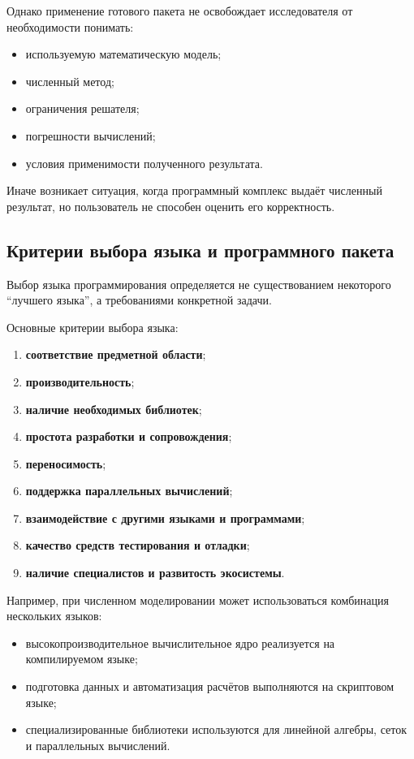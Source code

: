 Однако применение готового пакета не освобождает исследователя от необходимости понимать:
\begin{itemize}
	\item используемую математическую модель;
	\item численный метод;
	\item ограничения решателя;
	\item погрешности вычислений;
	\item условия применимости полученного результата.
\end{itemize}

Иначе возникает ситуация, когда программный комплекс выдаёт численный результат, но пользователь не способен оценить его корректность.


\subsection{Критерии выбора языка и программного пакета}

Выбор языка программирования определяется не существованием некоторого ``лучшего языка'', а требованиями конкретной задачи.

Основные критерии выбора языка:
\begin{enumerate}
	\item \textbf{соответствие предметной области};
	\item \textbf{производительность};
	\item \textbf{наличие необходимых библиотек};
	\item \textbf{простота разработки и сопровождения};
	\item \textbf{переносимость};
	\item \textbf{поддержка параллельных вычислений};
	\item \textbf{взаимодействие с другими языками и программами};
	\item \textbf{качество средств тестирования и отладки};
	\item \textbf{наличие специалистов и развитость экосистемы}.
\end{enumerate}

Например, при численном моделировании может использоваться комбинация нескольких языков:
\begin{itemize}
	\item высокопроизводительное вычислительное ядро реализуется на компилируемом языке;
	\item подготовка данных и автоматизация расчётов выполняются на скриптовом языке;
	\item специализированные библиотеки используются для линейной алгебры, сеток и параллельных вычислений.
\end{itemize}


